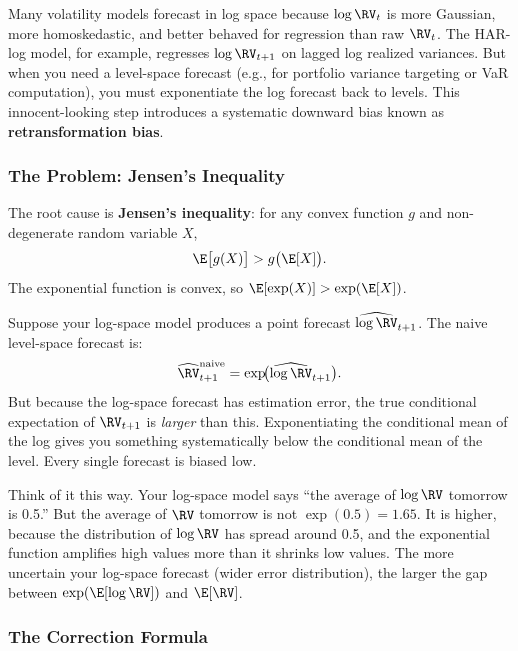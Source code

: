 Many volatility models forecast in log space because $\log \RV_t$ is more Gaussian, more homoskedastic, and better behaved for regression than raw $\RV_t$.
The HAR-log model, for example, regresses $\log \RV_{t+1}$ on lagged log realized variances.
But when you need a level-space forecast (e.g., for portfolio variance targeting or VaR computation), you must exponentiate the log forecast back to levels.
This innocent-looking step introduces a systematic downward bias known as \textbf{retransformation bias}.

\subsubsection{The Problem: Jensen's Inequality}

The root cause is \textbf{Jensen's inequality}: for any convex function $g$ and non-degenerate random variable $X$,
\begin{equation}
\label{eq:jensen}
\E\bigl[g(X)\bigr] > g\bigl(\E[X]\bigr).
\end{equation}
The exponential function is convex, so $\E[\exp(X)] > \exp(\E[X])$.

Suppose your log-space model produces a point forecast $\widehat{\log \RV}_{t+1}$.
The naive level-space forecast is:
\[
\widehat{\RV}^{\text{naive}}_{t+1} = \exp\!\bigl(\widehat{\log \RV}_{t+1}\bigr).
\]
But because the log-space forecast has estimation error, the true conditional expectation of $\RV_{t+1}$ is \emph{larger} than this.
Exponentiating the conditional mean of the log gives you something systematically below the conditional mean of the level.
Every single forecast is biased low.

\begin{intuition}
Think of it this way.
Your log-space model says ``the average of $\log \RV$ tomorrow is 0.5.''
But the average of $\RV$ tomorrow is not $\exp(0.5) = 1.65$.
It is higher, because the distribution of $\log \RV$ has spread around 0.5, and the exponential function amplifies high values more than it shrinks low values.
The more uncertain your log-space forecast (wider error distribution), the larger the gap between $\exp(\E[\log \RV])$ and $\E[\RV]$.
\end{intuition}

\subsubsection{The Correction Formula}

